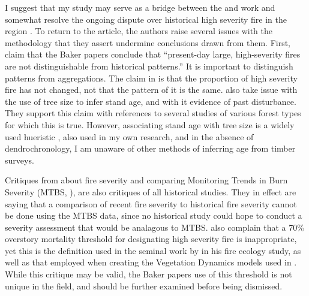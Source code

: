 I suggest that my study may serve as a bridge between the \citet{Baker2014} and \citet{Collins2011} work and somewhat resolve the ongoing dispute over historical high severity fire in the region \citep{Baker2014,Fule2014}. To return to the \citet{Fule2014} article, the authors raise several issues with the \citet{Baker2014} methodology that they assert undermine conclusions drawn from them. First, \citet{Fule2014} claim that the Baker papers \citep{Baker2012,Baker2014} conclude that ``present-day large, high-severity fires are not distinguishable from historical patterns.'' It is important to distinguish patterns from aggregations. The claim in \citet{Baker2012} is that the proportion of high severity fire has not changed, not that the pattern of it is the same. \citet{Fule2014} also take issue with the use of tree size to infer stand age, and with it evidence of past disturbance. They support this claim with references to several studies of various forest types for which this is true. However, associating stand age with tree size is a widely used hueristic \citep{WHR1988,Landfire2007,USDAForestService2009}, also used in my own research, and in the absence of dendrochronology, I am unaware of other methods of inferring age from timber surveys. 

Critiques from \citet{Fule2014} about fire severity and comparing Monitoring Trends in Burn Severity (MTBS, ), are also critiques of all historical studies. They in effect are saying that a comparison of recent fire severity to historical fire severity cannot be done using the MTBS data, since no historical study could hope to conduct a severity assessment that would be analagous to MTBS. \citet{Fule2014} also complain that a 70\% overstory mortality threshold for designating high severity fire is inappropriate, yet this is the definition used in the seminal work by \citet{Agee1993} in his fire ecology study, as well as that employed when creating the Vegetation Dynamics models used in \citet{Landfire2007}. While this critique may be valid, the Baker papers use of this threshold is not unique in the field, and should be further examined before being dismissed.

